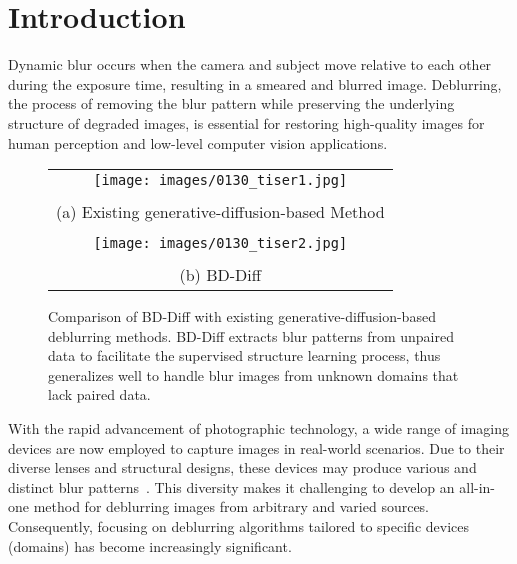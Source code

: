 \section{Introduction}
\label{Introduction}

Dynamic blur occurs when the camera and subject move relative to each other during the exposure time, resulting in a smeared and blurred image. Deblurring, the process of removing the blur pattern while preserving the underlying structure of degraded images, is essential for restoring high-quality images for human perception and low-level computer vision applications.

\begin{figure}[!t]
  \centering
  \setlength{\tabcolsep}{1pt} 
  \begin{tabular}{c}
    \texttt{[image: images/0130\_tiser1.jpg]} \\
    \multicolumn{1}{c}{\vspace{-17pt}} \\
    \small (a) Existing generative-diffusion-based Method \\
    \multicolumn{1}{c}{\vspace{-8pt}} \\
    \texttt{[image: images/0130\_tiser2.jpg]} \\
    \multicolumn{1}{c}{\vspace{-12pt}} \\
    \small (b) BD-Diff \\
  \end{tabular}
  \caption{Comparison of BD-Diff with existing generative-diffusion-based deblurring methods. BD-Diff extracts blur patterns from unpaired data to facilitate the supervised structure learning process, thus generalizes well to handle blur images from unknown domains that lack paired data.}
   \label{fig:introduction}
\end{figure}

With the rapid advancement of photographic technology, a wide range of imaging devices are now employed to capture images in real-world scenarios. Due to their diverse lenses and structural designs, these devices may produce various and distinct blur patterns~\cite{zhang2023neural,pham2024blur2blur,zhang2020deblurring}. This diversity makes it challenging to develop an all-in-one method for deblurring images from arbitrary and varied sources. Consequently, focusing on deblurring algorithms tailored to specific devices (domains) has become increasingly significant. 


